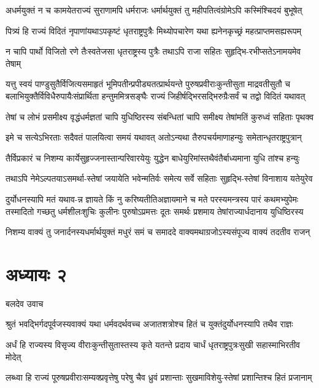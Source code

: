 \twolineshloka
{अधर्मयुक्तं न च कामयेतराज्यं सुराणामपि धर्मराजः}
{धर्मार्थयुक्तं तु महीपतित्वंग्रोमेऽपि कस्मिंश्चिदयं बुभूषेत्}


\twolineshloka
{पित्र्यं हि राज्यं विदितं नृपाणांयथाऽपकृष्टं धृतराष्ट्रपुत्रैः}
{मिथ्योपचारेण यथा ह्यनेनकृच्छ्रं महत्प्राप्तमसह्यरूपम्}


\twolineshloka
{न चापि पार्थो विजितो रणे तैःस्वतेजसा धृतराष्ट्रस्य पुत्रैः}
{तथाऽपि राजा सहितः सुहृद्भि-रभीप्सतेऽनामयमेव तेषाम्}


यत्तु स्वयं पाण्डुसुतैर्विजित्यसमाहृतं भूमिपतीन्प्रपीड्यतत्प्रार्थयन्ते पुरुषप्रवीराःकुन्तीसुता माद्रवतीसुतौ च
\twolineshloka
{बलाभियुक्तैर्विविधैरुपायैःसंप्रार्थिता हन्तुममित्रसङ्घैः}
{राज्यं जिहीर्षद्भिरसद्भिरुग्रैःसर्वं च तद्वो विदितं यथावत्}


\threelineshloka
{तेषां च लोभं प्रसमीक्ष्य वृद्धंधर्मज्ञतां चापि युधिष्ठिरस्य}
{संबन्धितां चापि समीक्ष्य तेषांमतिं कुरुध्वं सहिताः पृथक्व}
{}


\twolineshloka
{इमे च सत्येऽभिरताः सदैवतं पालयित्वा समयं यथावत्}
{अतोऽन्यथा तैरुपचर्यमाणाहन्युः समेतान्धृतराष्ट्रपुत्रान्}


\twolineshloka
{तैर्विप्रकारं च निशम्य कार्येसुहृज्जनास्तान्परिवारयेयुः}
{युद्धेन बाधेयुरिमांस्तथैवंतैर्बाध्यमाना युधि तांश्च हन्युः}


\twolineshloka
{तथाऽपि नेमेऽल्पतयाऽसमर्था-स्तेषां जयायेति भवेन्मतिर्वः}
{समेत्य सर्वे सहिताः सुहृद्भि-स्तेषां विनाशाय यतेयुरेव}


दुर्योधनस्यापि मतं यथाव-न्न ज्ञायते किं नु करिष्यतीतिअज्ञायमाने च मते परस्यमन्त्रस्य पारं कथमभ्युपेमः
\twolineshloka
{तस्मादितो गच्छतु धर्मशीलःशुचिः कुलीनः पुरुषोऽप्रमत्तः}
{दूतः समर्थः प्रशमाय तेषांराज्यार्धदानाय युधिष्ठिरस्य}


\twolineshloka
{निशम्य वाक्यं तु जनार्दनस्यधर्मार्थयुक्तं मधुरं समं च}
{समाददे वाक्यमथाग्रजोऽस्यसंपूज्य वाक्यं तदतीव राजन्}


\chapter{अध्यायः २}
\twolineshloka
{बलदेव उवाच}
{}


\twolineshloka
{श्रुतं भवद्भिर्गदपूर्वजस्यवाक्यं यथा धर्मवदर्थवच्च}
{अजातशत्रोश्च हितं च युक्तंदुर्योधनस्यापि तथैव राज्ञः}


\twolineshloka
{अर्धं हि राज्यस्य विसृज्य वीराःकुन्तीसुतास्तस्य कृते यतन्ते}
{प्रदाय चार्धं धृतराष्ट्रपुत्रःसुखी सहास्माभिरतीव मोदेत्}


\twolineshloka
{लब्ध्वा हि राज्यं पूरुषप्रवीराःसम्यक्प्रवृत्तेषु परेषु चैव}
{ध्रुवं प्रशान्ताः सुखमाविशेयु-स्तेषां प्रशान्तिश्च हितं प्रजानाम्}


